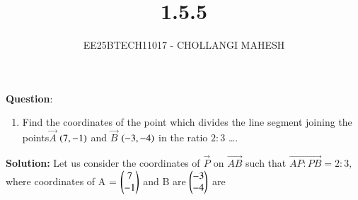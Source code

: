 \documentclass[journal]{IEEEtran}
\begin{document}

\vspace{3cm}

\title{1.5.5}
\author{EE25BTECH11017 - CHOLLANGI MAHESH}
{\let\newpage\relax\maketitle}

\renewcommand{\thefigure}{\theenumi}
\renewcommand{\thetable}{\theenumi}
\setlength{\intextsep}{10pt} %


\renewcommand{\thetable}{\theenumi}


\textbf{Question}:\\
\begin{enumerate}
\item Find the coordinates of the point which divides the line segment joining the points$\vec{A}$ $\left(7,-1\right)$ and $\vec{B}$ $\left(-3, -4\right)$ in the ratio $2 : 3$ \dots.
\end{enumerate}

\quad

\textbf{Solution:}
Let us consider the coordinates of $\vec{P}$  on $\vec{AB}$ such that $\vec{AP:PB}=2:3 ,$ where coordinates of A = $\begin{pmatrix}7\\-1\end{pmatrix}$ and B are $\begin{pmatrix}-3\\-4\end{pmatrix}$ are 
\end{document}
